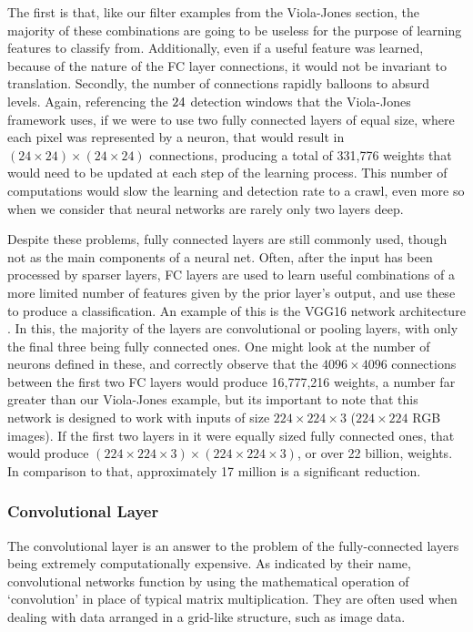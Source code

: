 \documentclass[11pt,a4paper,oldfontcommands]{memoir}
\begin{document}
The first is that, like our filter examples from the Viola-Jones section, the majority of these combinations are going to be useless for the purpose of learning features to classify from. Additionally, even if a useful feature was learned, because of the nature of the FC layer connections, it would not be invariant to translation. Secondly, the number of connections rapidly balloons to absurd levels. Again, referencing the $24 \time 24$ detection windows that the Viola-Jones framework uses, if we were to use two fully connected layers of equal size, where each pixel was represented by a neuron, that would result in $(24 \times 24) \times (24 \times 24)$ connections, producing a total of 331,776 weights that would need to be updated at each step of the learning process. This number of computations would slow the learning and detection rate to a crawl, even more so when we consider that neural networks are rarely only two layers deep. 

Despite these problems, fully connected layers are still commonly used, though not as the main components of a neural net. Often, after the input has been processed by sparser layers, FC layers are used to learn useful combinations of a more limited number of features given by the prior layer's output, and use these to produce a classification. An example of this is the VGG16 network architecture \cite{vgg16}. In this, the majority of the layers are convolutional or pooling layers, with only the final three being fully connected ones. One might look at the number of neurons defined in these, and correctly observe that the $4096 \times 4096$ connections between the first two FC layers would produce 16,777,216 weights, a number far greater than our Viola-Jones example, but its important to note that this network is designed to work with inputs of size $224 \times 224 \times 3$ ($224 \times 224$ RGB images). If the first two layers in it were equally sized fully connected ones, that would produce $(224 \times 224 \times 3) \times (224 \times 224 \times 3)$, or over 22 billion, weights. In comparison to that, approximately 17 million is a significant reduction.

\subsubsection{Convolutional Layer}
The convolutional layer is an answer to the problem of the fully-connected layers being extremely computationally expensive. As indicated by their name, convolutional networks function by using the mathematical operation of `convolution' in place of typical matrix multiplication. They are often used when dealing with data arranged in a grid-like structure, such as image data.
\end{document}
